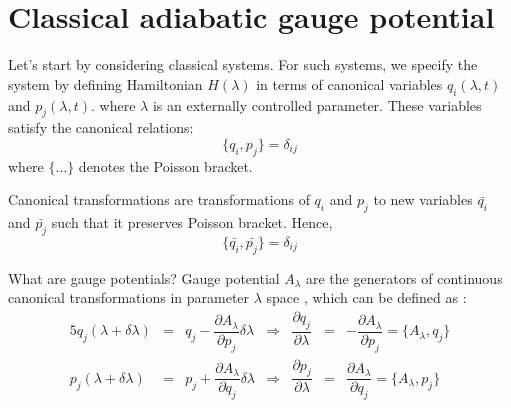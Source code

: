 \documentclass[11pt,a4paper]{article}
\begin{document}
%
%
%
%
%


\section{Classical adiabatic gauge potential}
Let's start by considering classical systems. For such systems, we specify the system by defining Hamiltonian $H (\lambda)$ in terms of canonical variables $q_i (\lambda,t)$ and $p_j (\lambda,t)$. where $\lambda$ is an externally controlled parameter. These variables satisfy the canonical relations:
\begin{equation}
\{q_i,p_j \}=\delta_{ij} 
\end{equation}
where $\{\ldots \}$ denotes the Poisson bracket.

Canonical transformations are transformations of $q_i$ and $p_j$ to new variables $\bar{q_i}$ and $\bar{p_j}$ such that it preserves Poisson bracket. Hence, 
\begin{equation}
\{\bar{q_i},\bar{p_j} \}=\delta_{ij} 
\end{equation}

What are gauge potentials? Gauge potential $A_{\lambda}$  are the generators of continuous canonical transformations in parameter $\lambda$ space , which can be defined as :
\begin{alignat}{5}
q_j(\lambda + \delta \lambda) & =& q_j - \dfrac{\partial A_{\lambda}}{\partial p_j} \delta \lambda &\Rightarrow & \dfrac{\partial q_j}{\partial \lambda} &=& -\dfrac{\partial A_{\lambda}}{\partial p_j} = \{A_{\lambda},q_j \} \\
p_j(\lambda + \delta \lambda) & =& p_j + \dfrac{\partial A_{\lambda}}{\partial q_j} \delta \lambda & \Rightarrow & \dfrac{\partial p_j}{\partial \lambda} &=& \dfrac{\partial A_{\lambda}}{\partial q_j}=\{ A_{\lambda},p_j \}
\label{def_A}
\end{alignat}
\end{document}
